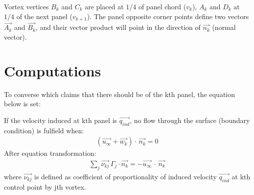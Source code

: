 \documentclass[a4paper,12pt,english]{jupyterBook}
\begin{document}
\sphinxAtStartPar
Vortex vertices \(B_k\) and \(C_k\) are placed at \(1/4\) of panel chord (\(v_{k}\)), \(A_k\) and \(D_k\) at \(1/4\) of the next panel (\(v_{k+1}\)). The panel opposite corner points define two vectors \(\overrightarrow{A_k}\) and \(\overrightarrow{B_k}\), and their vector product will point in the direction of \(\overrightarrow{n_k}\) (normal vector).


\section{Computations}
\label{\detokenize{chapters/description/theory:computations}}
\sphinxAtStartPar
To converse  which claims that there should be  of the k\sphinxhyphen{}th panel, the equation below is set:

\sphinxAtStartPar
If the velocity induced at k\sphinxhyphen{}th panel is \(\overrightarrow{q_{ind}}\), no flow through the surface (boundary condition) is fulfield when:
\begin{equation}\label{equation:chapters/description/theory:bc}
\begin{split}
(\overrightarrow{u_{\infty}} + \overrightarrow{w_k})\cdot\,\overrightarrow{n_k}=0
\end{split}
\end{equation}
\sphinxAtStartPar
After equation transformation:
\begin{equation}\label{equation:chapters/description/theory:bc2}
\begin{split}
\sum_{j} \overrightarrow{\nu_{kj}}  \, \Gamma_{j} \cdot \overrightarrow{n_k}=-\overrightarrow{u_{\infty}}\,\cdot\,\overrightarrow{n_k}
\end{split}
\end{equation}
\sphinxAtStartPar
where \(\overrightarrow{\nu_{kj}}\) is defined as coefficient of proportionality of induced velocity \(\overrightarrow{q_{ind}}\) at k\sphinxhyphen{}th control point by j\sphinxhyphen{}th vortex.
\end{document}
